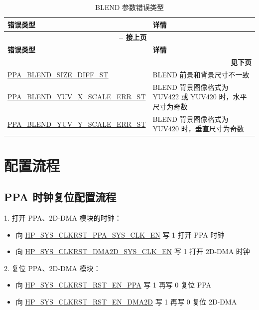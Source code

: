 \documentclass[main\_\_CN.tex]{subfiles}
\begin{document}
\begin{longtable}[c]{ |p{6cm}|p{10cm}| }
    \caption{BLEND 参数错误类型}
    \label{tab:blend_param_err}\\\hline

    \rowcolor{lightgray}
    \textbf{错误类型} & \textbf{详情} \\\hline
    \endfirsthead


    \multicolumn{2}{c}{\bfseries \tablename\ \thetable{} -- 接上页}\\\hline
    \rowcolor{lightgray}
    \textbf{错误类型} & \textbf{详情}  \\\hline
    \endhead

    \multicolumn{2}{r}{\textbf{见下页}} \\
    \endfoot

    \endlastfoot

        \hyperref[fielddesc:PPABLENDSIZEDIFFST]{PPA\_BLEND\_SIZE\_DIFF\_ST} & BLEND 前景和背景尺寸不一致 \\\hline
        \hyperref[fielddesc:PPABLENDYUVXSCALEERRST]{PPA\_BLEND\_YUV\_X\_SCALE\_ERR\_ST} & BLEND 背景图像格式为 YUV422 或 YUV420 时，水平尺寸为奇数 \\\hline
        \hyperref[fielddesc:PPABLENDYUVYSCALEERRST]{PPA\_BLEND\_YUV\_Y\_SCALE\_ERR\_ST} & BLEND 背景图像格式为 YUV420 时，垂直尺寸为奇数 \\\hline

\end{longtable}




\section{配置流程}
\label{sec:ppa-prog-procedures}

\subsection{PPA 时钟复位配置流程}
\label{sec:ppa_clk_rst}
1. 打开 PPA、2D-DMA 模块的时钟：
\begin{itemize}
    \item 向 \hyperref[fielddesc:HPSYSCLKRSTPPASYSCLKEN]{HP\_SYS\_CLKRST\_PPA\_SYS\_CLK\_EN} 写 1 打开 PPA 时钟
    \item 向 \hyperref[fielddesc:HPSYSCLKRSTDMA2DSYSCLKEN]{HP\_SYS\_CLKRST\_DMA2D\_SYS\_CLK\_EN} 写 1 打开 2D-DMA 时钟
\end{itemize}
2. 复位 PPA、2D-DMA 模块：
\begin{itemize}
    \item 向 \hyperref[fielddesc:HPSYSCLKRSTRSTENPPA]{HP\_SYS\_CLKRST\_RST\_EN\_PPA} 写 1 再写 0 复位 PPA
    \item 向 \hyperref[fielddesc:HPSYSCLKRSTRSTENDMA2D]{HP\_SYS\_CLKRST\_RST\_EN\_DMA2D} 写 1 再写 0 复位 2D-DMA
\end{itemize}
\end{document}
